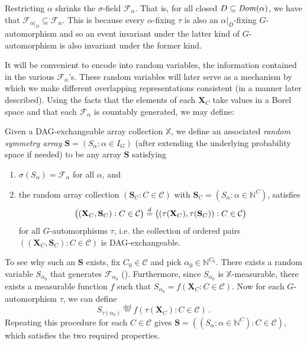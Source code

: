 \documentclass[AHL,Unicode,longabstracts,published]{cedram}
\newcommand{\alf}{\alpha}%
\newcommand*{\defeq}{\stackrel{\mathrm{def}}{=}}
\newcommand{\indices}[1]{\mathbb{N}^{#1}}
\renewcommand{\d}{\buildrel{d}\over{=}}
\newcommand*\dom{\mathit{Dom}}
\newcommand*\X{\mathbb{X}}
\newcommand*\N{\mathbb{N}}
\newcommand*\CC{{\mathcal{C}}}
\newcommand*\FF{\mathcal{F}}
\newcommand*\bS{\mathbf{S}}
\newcommand*\bX{\mathbf{X}}
\newcommand*\N{\mathbb{N}}
\begin{document}
\begin{rema}
Restricting $\alf$ shrinks the $\sigma$-field $\mathcal{F}_\alf$. That is, for all closed $D\linebreak\subseteq \dom(\alf)$, we have that $\mathcal{F}_{\alf|_D} \subseteq \mathcal{F}_\alf$. This is because every $\alf$-fixing $\tau$ is also an $\alf|_D$-fixing $G$-automorphism and so an event invariant under the latter kind of $G$-automorphism is also invariant under the former kind.
\end{rema}


It will be convenient to encode into random variables, the information contained in the various $\FF_\alf$'s. These random variables will later serve as a mechanism by which we make different overlapping representations consistent (in a manner later described). Using the facts that the elements of each $\bX_C$ take values in a Borel space and that each $\FF_\alf $ is countably generated, we may define:

\begin{defi}
Given a DAG-exchangeable array collection $\X$, we define an associated \emph{random symmetry array} $\bS =(S_\alf : \alf \in I_G)$ (after extending the underlying probability space if needed) to be any array $\bS$ satisfying
\begin{enumerate}
\item $\sigma(S_\alf)=\mathcal{F}_\alf $ for all $\alf$, and
\item the random array collection $(\bS_C : C \in \CC)$ with $\bS_C = (S_\alf : \alf \in \indices C)$, satisfies
\[
\big((\bX_C,\bS_C) : C \in \CC\big) \d \big((\tau(\bX_C),\tau(\bS_C)) : C \in \CC\big)
\]
for all $G$-automorphisms $\tau$, i.e. the collection of ordered pairs $((\bX_C,\bS_C) : C \in \CC)$ is DAG-exchangeable.
\end{enumerate}
\end{defi}

To see why such an $\bS$ exists, fix $C_0 \in \CC$ and pick $\alpha_0 \in \N^{C_0}$. There exists a random variable $S_{\alpha_0}$ that generates $\mathcal{F}_{\alf_0}$ (\cite[Chapter 3, Exercice~13]{resnick2013probability}). Furthermore, since $S_{\alpha_0}$ is $\X$-measurable, there exists a measurable function $f$ such that $S_{\alpha_0} = f(\bX_C: C \in \CC)$. Now for each $G$-automorphism $\tau$, we can define
\[
S_{\tau(\alpha_0)}
\defeq f(\tau(\bX_C): C \in \CC)\,.
\]
Repeating this procedure for each $C \in \CC$ gives $\bS = ((S_\alf : \alf \in \indices C) : C \in \CC)$, which satisfies the two required properties.
\end{document}
